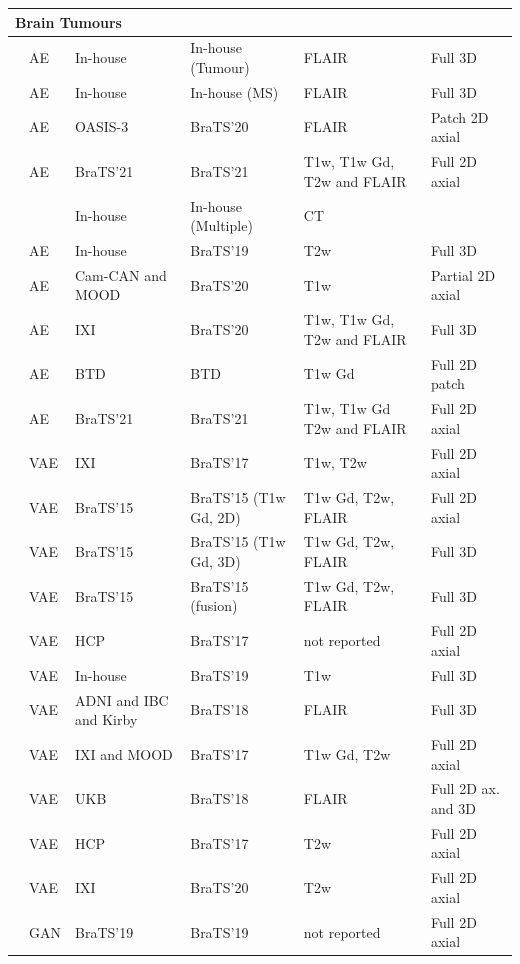 \begin{longtable}{p{4.2cm}p{1.3cm}p{3.2cm}p{3cm}p{4cm}p{3.3cm}}
\multicolumn{6}{l}{\textbf{Brain Tumours}} \\
\midrule
\citet{Baur2021-2} & AE & In-house &  In-house (Tumour) & FLAIR & Full 3D \\
\citet{Baur2021-2} & AE & In-house &  In-house (MS) & FLAIR & Full 3D \\
\citet{Ghorbel2023} & AE & OASIS-3 & BraTS'20 & FLAIR & Patch 2D axial \\
\citet{Kascenas2023} & AE & BraTS'21 & BraTS'21 & T1w, T1w Gd, T2w and FLAIR & Full 2D axial \\
 & & In-house & In-house (Multiple) & CT &  \\
\citet{Luo2023} & AE & In-house & BraTS'19 & T2w & Full 3D \\
\citet{Meissen2023} & AE & Cam-CAN and MOOD\ & BraTS'20 & T1w & Partial 2D axial \\
\citet{Jimenez-Garcia2024} & AE & IXI & BraTS'20 & T1w, T1w Gd, T2w and FLAIR & Full 3D \\
\citet{Lu2024} & AE & BTD & BTD & T1w Gd & Full 2D patch \\
\citet{Qu2026} & AE & BraTS'21 & BraTS'21 & T1w, T1w Gd T2w and FLAIR & Full 2D axial\\
\citet{Sato2019} & VAE & IXI & BraTS'17 & T1w, T2w & Full 2D axial\\
\citet{Uzunova2019} & VAE & BraTS'15 & BraTS'15 (T1w Gd, 2D) & T1w Gd, T2w, FLAIR & Full 2D axial \\
\citet{Uzunova2019} & VAE & BraTS'15 & BraTS'15 (T1w Gd, 3D) & T1w Gd, T2w, FLAIR & Full 3D \\
\citet{Uzunova2019} & VAE & BraTS'15 & BraTS'15 (fusion) & T1w Gd, T2w, FLAIR & Full 3D \\
\citet{Zimmerer2019} & VAE & HCP & BraTS'17 & not reported & Full 2D axial \\
\citet{Bengs2021} & VAE & In-house & BraTS'19 & T1w & Full 3D \\
\citet{Lambert2021} & VAE & ADNI and IBC and Kirby & BraTS'18 & FLAIR & Full 3D \\
\citet{Chatterjee2022} & VAE & IXI and MOOD & BraTS'17 & T1w Gd, T2w & Full 2D axial \\
\citet{Pinaya2022-2} & VAE & UKB & BraTS'18 & FLAIR & Full 2D ax. and 3D\\
\citet{Lüth2023} & VAE & HCP & BraTS'17 & T2w & Full 2D axial \\
\citet{Wijanarko2024}  & VAE & IXI & BraTS'20 & T2w & Full 2D axial \\
\citet{Dey2021} & GAN & BraTS'19 & BraTS'19 & not reported & Full 2D axial \\

\end{longtable}
